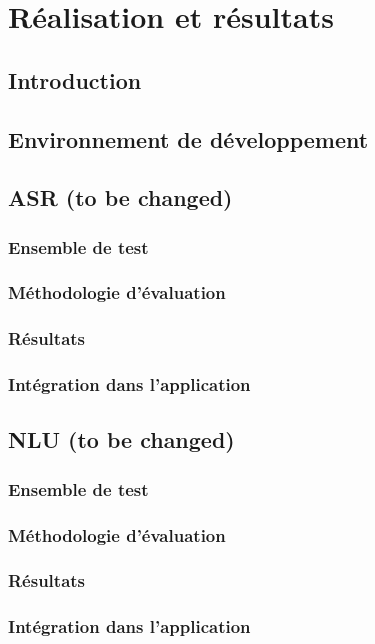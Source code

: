 \chapter{Réalisation et résultats}
\section{Introduction}

\section{Environnement de développement}

\section{ASR (to be changed)}
\subsection{Ensemble de test}
\subsection{Méthodologie d'évaluation}
\subsection{Résultats}
\subsection{Intégration dans l'application}


\section{NLU (to be changed)}
\subsection{Ensemble de test}
\subsection{Méthodologie d'évaluation}
\subsection{Résultats}
\subsection{Intégration dans l'application}


